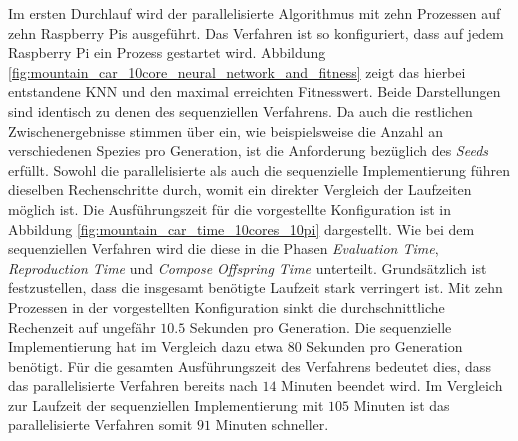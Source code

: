 Im ersten Durchlauf wird der parallelisierte Algorithmus mit zehn Prozessen auf zehn Raspberry Pis ausgeführt. Das Verfahren ist so konfiguriert, dass auf jedem Raspberry Pi ein Prozess gestartet wird. Abbildung \ref{fig:mountain_car_10core_neural_network_and_fitness} zeigt das hierbei entstandene \ac{KNN} und den maximal erreichten Fitnesswert. Beide Darstellungen sind identisch zu denen des sequenziellen Verfahrens. Da auch die restlichen Zwischenergebnisse stimmen über ein, wie beispielsweise die Anzahl an verschiedenen Spezies pro Generation, ist die Anforderung bezüglich des \emph{Seeds} erfüllt. Sowohl die parallelisierte als auch die sequenzielle Implementierung führen dieselben Rechenschritte durch, womit ein direkter Vergleich der Laufzeiten möglich ist. Die Ausführungszeit für die vorgestellte Konfiguration ist in Abbildung  \ref{fig:mountain_car_time_10cores_10pi} dargestellt. Wie bei dem sequenziellen Verfahren wird die diese in die Phasen \emph{Evaluation Time}, \emph{Reproduction Time} und \emph{Compose Offspring Time} unterteilt. Grundsätzlich ist festzustellen, dass die insgesamt benötigte Laufzeit stark verringert ist. Mit zehn Prozessen in der vorgestellten Konfiguration sinkt die durchschnittliche Rechenzeit auf ungefähr $10.5$ Sekunden pro Generation. Die sequenzielle Implementierung hat im Vergleich dazu etwa $80$ Sekunden pro Generation benötigt. Für die gesamten Ausführungszeit des Verfahrens bedeutet dies, dass das parallelisierte Verfahren bereits nach $14$ Minuten beendet wird. Im Vergleich zur Laufzeit der sequenziellen Implementierung mit $105$ Minuten ist das parallelisierte Verfahren somit $91$ Minuten schneller.
\\\\
